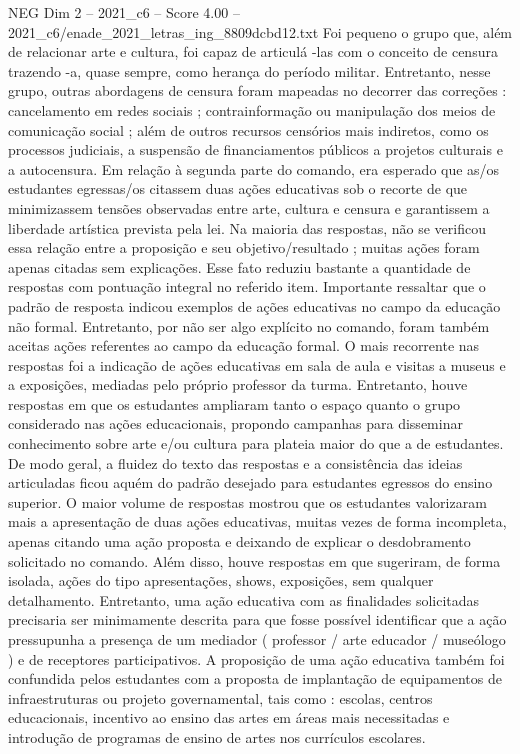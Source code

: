 \begin{textsample}{NEG Dim 2 – 2021\_c6 – Score 4.00 – 2021\_c6/enade\_2021\_letras\_ing\_8809dcbd12.txt}
Foi pequeno o grupo que, além de relacionar arte e cultura, foi capaz de articulá -las com o conceito de censura trazendo -a, quase sempre, como herança do período militar.
Entretanto, nesse grupo, outras abordagens de censura foram mapeadas no decorrer das correções : cancelamento em redes sociais ; contrainformação ou manipulação dos meios de comunicação social ; além de outros recursos censórios mais indiretos, como os processos judiciais, a suspensão de financiamentos públicos a projetos culturais e a autocensura.
Em relação à segunda parte do comando, era esperado que as/os estudantes egressas/os citassem duas ações educativas sob o recorte de que minimizassem tensões observadas entre arte, cultura e censura e garantissem a liberdade artística prevista pela lei.
Na maioria das respostas, não se verificou essa relação entre a proposição e seu objetivo/resultado ; muitas ações foram apenas citadas sem explicações.
Esse fato reduziu bastante a quantidade de respostas com pontuação integral no referido item.
Importante ressaltar que o padrão de resposta indicou exemplos de ações educativas no campo da educação não formal.
Entretanto, por não ser algo explícito no comando, foram também aceitas ações referentes ao campo da educação formal.
O mais recorrente nas respostas foi a indicação de ações educativas em sala de aula e visitas a museus e a exposições, mediadas pelo próprio professor da turma.
Entretanto, houve respostas em que os estudantes ampliaram tanto o espaço quanto o grupo considerado nas ações educacionais, propondo campanhas para disseminar conhecimento sobre arte e/ou cultura para plateia maior do que a de estudantes.
De modo geral, a fluidez do texto das respostas e a consistência das ideias articuladas ficou aquém do padrão desejado para estudantes egressos do ensino superior.
O maior volume de respostas mostrou que os estudantes valorizaram mais a apresentação de duas ações educativas, muitas vezes de forma incompleta, apenas citando uma ação proposta e deixando de explicar o desdobramento solicitado no comando.
Além disso, houve respostas em que sugeriram, de forma isolada, ações do tipo apresentações, shows, exposições, sem qualquer detalhamento.
Entretanto, uma ação educativa com as finalidades solicitadas precisaria ser minimamente descrita para que fosse possível identificar que a ação pressupunha a presença de um mediador ( professor / arte educador / museólogo ) e de receptores participativos.
A proposição de uma ação educativa também foi confundida pelos estudantes com a proposta de implantação de equipamentos de infraestruturas ou projeto governamental, tais como : escolas, centros educacionais, incentivo ao ensino das artes em áreas mais necessitadas e introdução de programas de ensino de artes nos currículos escolares.

\end{textsample}
